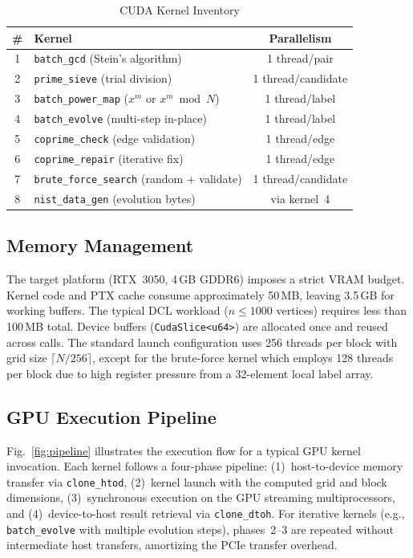 \documentclass[lettersize,journal]{IEEEtran}
\begin{document}
\begin{table}[!t]
\caption{CUDA Kernel Inventory\label{tab:kernels}}
\centering
\begin{tabular}{@{}clc@{}}
\toprule
\textbf{\#} & \textbf{Kernel} & \textbf{Parallelism} \\
\midrule
1 & \texttt{batch\_gcd} (Stein's algorithm) & 1 thread/pair \\
2 & \texttt{prime\_sieve} (trial division) & 1 thread/candidate \\
3 & \texttt{batch\_power\_map} ($x^m$ or $x^m \bmod N$) & 1 thread/label \\
4 & \texttt{batch\_evolve} (multi-step in-place) & 1 thread/label \\
5 & \texttt{coprime\_check} (edge validation) & 1 thread/edge \\
6 & \texttt{coprime\_repair} (iterative fix) & 1 thread/edge \\
7 & \texttt{brute\_force\_search} (random + validate) & 1 thread/candidate \\
8 & \texttt{nist\_data\_gen} (evolution bytes) & via kernel~4 \\
\bottomrule
\end{tabular}
\end{table}

\subsection{Memory Management}

The target platform (RTX~3050, 4\,GB GDDR6) imposes a strict VRAM budget. Kernel code and PTX cache consume approximately 50\,MB, leaving 3.5\,GB for working buffers. The typical DCL workload ($n \leq 1000$ vertices) requires less than 100\,MB total. Device buffers (\texttt{CudaSlice<u64>}) are allocated once and reused across calls. The standard launch configuration uses 256 threads per block with grid size $\lceil N/256 \rceil$, except for the brute-force kernel which employs 128 threads per block due to high register pressure from a 32-element local label array.

\subsection{GPU Execution Pipeline}

Fig.~\ref{fig:pipeline} illustrates the execution flow for a typical GPU kernel invocation. Each kernel follows a four-phase pipeline: (1)~host-to-device memory transfer via \texttt{clone\_htod}, (2)~kernel launch with the computed grid and block dimensions, (3)~synchronous execution on the GPU streaming multiprocessors, and (4)~device-to-host result retrieval via \texttt{clone\_dtoh}. For iterative kernels (e.g., \texttt{batch\_evolve} with multiple evolution steps), phases~2--3 are repeated without intermediate host transfers, amortizing the PCIe transfer overhead.
\end{document}
